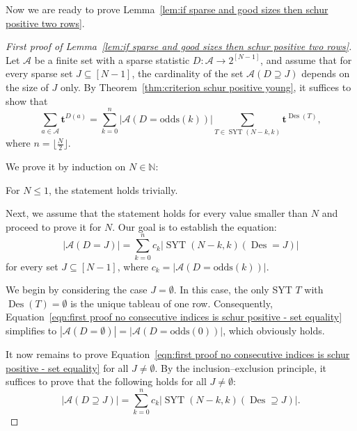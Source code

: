 \documentclass[ALCO]{cedram}
\newcommand{\Des}{\operatorname{Des}}
\newcommand{\Syt}{\operatorname{SYT}}
\newcommand{\NN}{\mathbb{N}}
\newcommand{\A}{\mathcal{A}}
\newcommand{\odds}{\mathrm{odds}}
\begin{document}
Now we are ready to prove Lemma~\ref{lem:if sparse and good sizes then schur positive two rows}.
\begin{proof}[First proof of Lemma~\ref{lem:if sparse and good sizes then schur positive two rows}]
    Let $\A$ be a finite set with a sparse statistic $D:\A \to 2^{[N-1]}$, and assume that for every sparse set $J \subseteq [N-1]$, the cardinality of the set $\A(D \supseteq J)$ depends on the size of $J$ only.
    By Theorem~\ref{thm:criterion schur positive young}, it suffices to show that
    \begin{equation}\label{eqn:first proof no consecutive indices is schur positive - generating function}
        \sum_{a \in \A} \boldsymbol{t}^{D(a)} = \sum_{k=0}^n |\A(D=\odds(k))| \sum_{T \in \Syt(N-k,k)} \boldsymbol{t}^{\Des(T)},
    \end{equation}
    where $n = \lfloor\frac{N}{2}\rfloor$.
    
    We prove it by induction on $N \in \NN$:
    
    For $N \le 1$, the statement holds trivially.
    
    Next, we assume that the statement holds for every value smaller than $N$ and proceed to prove it for $N$. Our goal is to establish the equation:
    \begin{equation}\label{eqn:first proof no consecutive indices is schur positive - set equality}
        \left|\A(D=J)\right| = \sum_{k=0}^n c_k \left|\Syt(N-k,k)(\Des=J)\right|
    \end{equation}
    for every set $J \subseteq [N-1]$, where $c_k = \left|\A(D=\odds(k))\right|$.
    
    We begin by considering the case $J = \emptyset$. In this case, the only SYT $T$ with $\Des(T) = \emptyset$ is the unique tableau of one row. Consequently, Equation~\eqref{eqn:first proof no consecutive indices is schur positive - set equality} simplifies to $\left|\A(D=\emptyset)\right| = \left|\A(D=\odds(0))\right|$, which obviously holds.
    
    It now remains to prove Equation~\eqref{eqn:first proof no consecutive indices is schur positive - set equality} for all $J \ne \emptyset$. By  the inclusion--exclusion principle, it suffices to prove that the following holds for all $J \ne \emptyset$:
    \begin{equation}\label{eqn:first proof no consecutive indices is schur positive - set containment}
        \left|\A(D \supseteq J)\right| = \sum_{k=0}^n c_k \left|\Syt(N-k,k)(\Des \supseteq J)\right|.
    \end{equation}
    

\end{proof}
\end{document}
